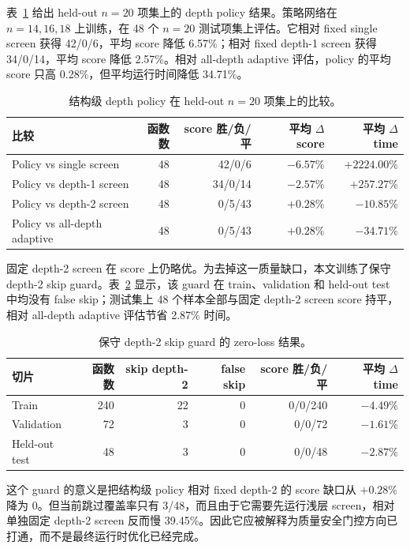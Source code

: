 \documentclass[UTF8,fontset=macnew,11pt]{ctexart}
\begin{document}
表~\ref{tab:policy} 给出 held-out $n=20$ 项集上的 depth policy 结果。策略网络在 $n=14,16,18$ 上训练，在 48 个 $n=20$ 测试项集上评估。它相对 fixed single screen 获得 42/0/6，平均 score 降低 6.57\%；相对 fixed depth-1 screen 获得 34/0/14，平均 score 降低 2.57\%。相对 all-depth adaptive 评估，policy 的平均 score 只高 0.28\%，但平均运行时间降低 34.71\%。

\begin{table}[t]
\centering
\small
\caption{结构级 depth policy 在 held-out $n=20$ 项集上的比较。}
\label{tab:policy}
\begin{tabular}{lrrrr}
\toprule
比较 & 函数数 & score 胜/负/平 & 平均 $\Delta$ score & 平均 $\Delta$ time \\
\midrule
Policy vs single screen & 48 & 42/0/6 & $-6.57\%$ & $+2224.00\%$ \\
Policy vs depth-1 screen & 48 & 34/0/14 & $-2.57\%$ & $+257.27\%$ \\
Policy vs depth-2 screen & 48 & 0/5/43 & $+0.28\%$ & $-10.85\%$ \\
Policy vs all-depth adaptive & 48 & 0/5/43 & $+0.28\%$ & $-34.71\%$ \\
\bottomrule
\end{tabular}
\end{table}

固定 depth-2 screen 在 score 上仍略优。为去掉这一质量缺口，本文训练了保守 depth-2 skip guard。表~\ref{tab:guard} 显示，该 guard 在 train、validation 和 held-out test 中均没有 false skip；测试集上 48 个样本全部与固定 depth-2 screen score 持平，相对 all-depth adaptive 评估节省 2.87\% 时间。

\begin{table}[t]
\centering
\small
\caption{保守 depth-2 skip guard 的 zero-loss 结果。}
\label{tab:guard}
\begin{tabular}{lrrrrr}
\toprule
切片 & 函数数 & skip depth-2 & false skip & score 胜/负/平 & 平均 $\Delta$ time \\
\midrule
Train & 240 & 22 & 0 & 0/0/240 & $-4.49\%$ \\
Validation & 72 & 3 & 0 & 0/0/72 & $-1.61\%$ \\
Held-out test & 48 & 3 & 0 & 0/0/48 & $-2.87\%$ \\
\bottomrule
\end{tabular}
\end{table}

这个 guard 的意义是把结构级 policy 相对 fixed depth-2 的 score 缺口从 $+0.28\%$ 降为 $0$。但当前跳过覆盖率只有 3/48，而且由于它需要先运行浅层 screen，相对单独固定 depth-2 screen 反而慢 39.45\%。因此它应被解释为质量安全门控方向已打通，而不是最终运行时优化已经完成。
\end{document}
